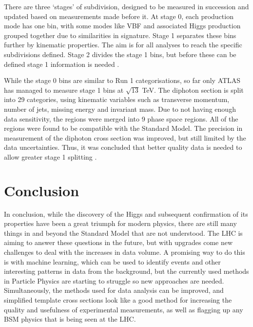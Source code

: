 \documentclass[12pt]{article}
\begin{document}
There are three `stages' of subdivision, designed to be measured in succession and updated based on measurements made before it. At stage 0, each production mode has one bin, with some modes like VBF and associated Higgs production grouped together due to similarities in signature. Stage 1 separates these bins further by kinematic properties. The aim is for all analyses to reach the specific subdivisions defined. Stage 2 divides the stage 1 bins, but before these can be defined stage 1 information is needed \cite{stxs3}. 


While the stage 0 bins are similar to Run 1 categorisations, so far only ATLAS has managed to measure stage 1 bins at $\sqrt{13}$ TeV. The diphoton section is split into 29 categories, using kinematic variables such as transverse momentum, number of jets, missing energy and invariant mass. Due to not having enough data sensitivity, the regions were merged into 9 phase space regions. All of the regions were found to be compatible with the Standard Model. The precision in measurement of the diphoton cross section was improved, but still limited by the data uncertainties. Thus, it was concluded that better quality data is needed to allow greater stage 1 splitting \cite{stxs2}. 
 

\section*{Conclusion}
In conclusion, while the discovery of the Higgs and subsequent confirmation of its properties have been a great triumph for modern physics, there are still many things in and beyond the Standard Model that are not understood. The LHC is aiming to answer these questions in the future, but with upgrades come new challenges to deal with the increases in data volume. A promising way to do this is with machine learning, which can be used to identify events and other interesting patterns in data from the background, but the currently used methods in Particle Physics are starting to struggle so new approaches are needed. Simultaneously, the methods used for data analysis can be improved, and simplified template cross sections look like a good method for increasing the quality and usefulness of experimental measurements, as well as flagging up any BSM physics that is being seen at the LHC.


{}

\end{document}
